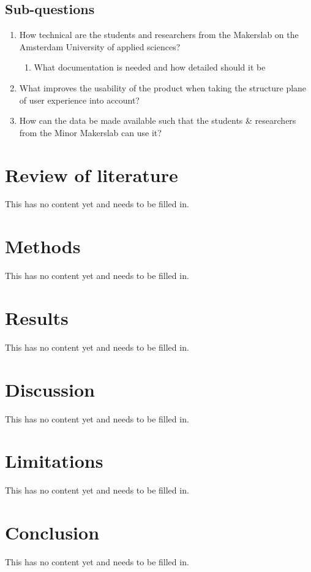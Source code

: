 \documentclass{report}
\begin{document}
\section{Sub-questions}
\begin{enumerate}
\item How technical are the students and researchers from the Makerslab on the Amsterdam University of applied sciences?
\begin{enumerate}
\item What documentation is needed and how detailed should it be
\end{enumerate}
\item What improves the usability of the product when taking the structure plane of user experience into account?
\item How can the data be made available such that the students \& researchers from the Minor Makerslab can use it?
\end{enumerate}

\chapter{Review of literature}
This has no content yet and needs to be filled in. 

\chapter{Methods}
This has no content yet and needs to be filled in. 

\chapter{Results}
This has no content yet and needs to be filled in. 

\chapter{Discussion}
This has no content yet and needs to be filled in. 

\chapter{Limitations}
This has no content yet and needs to be filled in. 

\chapter{Conclusion}
This has no content yet and needs to be filled in. 


\end{document}
